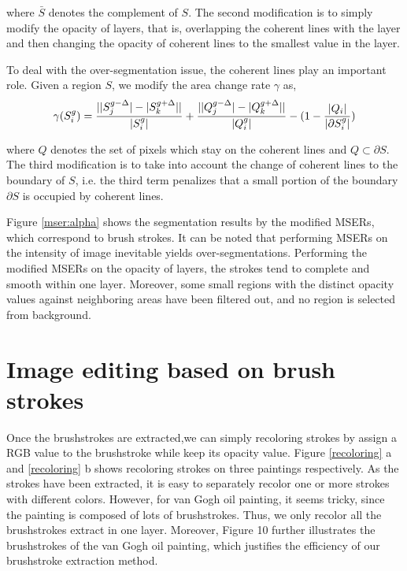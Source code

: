 where $ \bar{S} $ denotes the complement of $S$. The second modification is to simply modify the opacity of layers, that is, overlapping the coherent lines with the layer and then changing the opacity of coherent lines to the smallest value in the layer.

To deal with the over-segmentation issue, the coherent lines play an important role. Given a region $S$, we modify the area change rate $\gamma$ as,
\begin{equation}
\gamma(S_i^g)=\frac{  \lvert \lvert S_j^{g-\Delta}\rvert -\lvert S_k^{g+\Delta} \rvert
	 \rvert     }{\arrowvert S_i^g\arrowvert} + \frac{  \lvert \lvert Q_j^{g-\Delta}\rvert -\lvert Q_k^{g+\Delta} \rvert
	 \rvert     }{\arrowvert Q_i^g\arrowvert} - (1-\frac{\lvert Q_i\rvert}{\lvert \partial S_i^g \rvert} )
\end{equation}


where $Q$ denotes the set of pixels which stay on the coherent lines and $Q \subset \partial S $. The third modification is to take into account the change of coherent lines to the boundary of $S$, i.e. the third term penalizes that a small portion of the boundary $\partial S$ is occupied by coherent lines.

Figure \ref{mser:alpha} shows the segmentation results by the modified MSERs, which correspond to brush strokes. It can be noted that performing MSERs on the intensity of image inevitable yields over-segmentations. Performing the modified MSERs on the opacity of layers, the strokes tend to complete and smooth within one layer. Moreover, some small regions with the distinct opacity values against neighboring areas have been filtered out, and no region is selected from background. 


\section{Image editing based on brush strokes}\label{editing}

Once the brushstrokes are extracted,we can simply recoloring strokes by assign a RGB value to the brushstroke while keep its opacity value.
Figure \ref{recoloring} a and \ref{recoloring} b shows recoloring strokes on three paintings respectively. As the strokes have been extracted, it is easy to separately recolor one or more strokes with different colors. However, for van Gogh oil painting, it seems tricky, since the painting is composed of lots of brushstrokes. Thus, we only recolor all the brushstrokes extract in one layer.
Moreover, Figure 10 further illustrates the brushstrokes of the van Gogh oil painting, which justifies the efficiency of our brushstroke extraction method.


